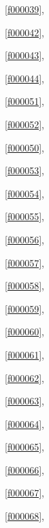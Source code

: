 \noindent\filesourcenumbernameone\ \ref{f000039},\ \pageref{f000039}%

\noindent\filesourcenumbernameone\ \ref{f000042},\ \pageref{f000042}%

\noindent\filesourcenumbernameone\ \ref{f000043},\ \pageref{f000043}%

\noindent\filesourcenumbernameone\ \ref{f000044},\ \pageref{f000044}%

\noindent\filesourcenumbernameone\ \ref{f000051},\ \pageref{f000051}%

\noindent\filesourcenumbernameone\ \ref{f000052},\ \pageref{f000052}%

\noindent\filesourcenumbernameone\ \ref{f000050},\ \pageref{f000050}%

\noindent\filesourcenumbernameone\ \ref{f000053},\ \pageref{f000053}%

\noindent\filesourcenumbernameone\ \ref{f000054},\ \pageref{f000054}%

\noindent\filesourcenumbernameone\ \ref{f000055},\ \pageref{f000055}%

\noindent\filesourcenumbernameone\ \ref{f000056},\ \pageref{f000056}%

\noindent\filesourcenumbernameone\ \ref{f000057},\ \pageref{f000057}%

\noindent\filesourcenumbernameone\ \ref{f000058},\ \pageref{f000058}%

\noindent\filesourcenumbernameone\ \ref{f000059},\ \pageref{f000059}%

\noindent\filesourcenumbernameone\ \ref{f000060},\ \pageref{f000060}%

\noindent\filesourcenumbernameone\ \ref{f000061},\ \pageref{f000061}%

\noindent\filesourcenumbernameone\ \ref{f000062},\ \pageref{f000062}%

\noindent\filesourcenumbernameone\ \ref{f000063},\ \pageref{f000063}%

\noindent\filesourcenumbernameone\ \ref{f000064},\ \pageref{f000064}%

\noindent\filesourcenumbernameone\ \ref{f000065},\ \pageref{f000065}%

\noindent\filesourcenumbernameone\ \ref{f000066},\ \pageref{f000066}%

\noindent\filesourcenumbernameone\ \ref{f000067},\ \pageref{f000067}%

\noindent\filesourcenumbernameone\ \ref{f000068},\ \pageref{f000068}%

